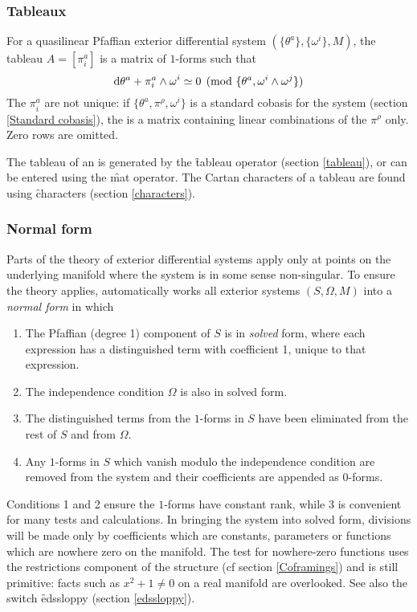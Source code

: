 \subsubsection{Tableaux}
\label{Tableaux}

For a quasilinear Pfaffian exterior differential system
$(\{\theta^a\},\{\omega^i\},M)$, the tableau $A=[\pi^a_i]$
is a matrix of $1$-forms such that
\[	\mathrm{d} \theta^a + \pi^a_i\wedge\omega^i \simeq 0
		\pmod{\{\theta^a,\omega^i\wedge\omega^j\}}
\]
The $\pi^a_i$ are not unique: if $\{\theta^a,\pi^\rho,\omega^i\}$ is a
standard cobasis for the system (section \ref{Standard cobasis}), the 
 is a matrix containing linear combinations of the $\pi^\rho$
only. Zero rows are omitted.

The tableau of an  is generated by the \f{tableau} operator
(section \ref{tableau}), or can be entered using the \f{mat} operator. The
Cartan characters of a tableau are found using \f{characters} (section
\ref{characters}).

\subsubsection{Normal form}
\label{Normal form}

Parts of the theory of exterior differential systems apply only at points
on the underlying manifold where the system is in some sense
non-singular. To ensure the theory applies,  automatically works all
exterior systems $(S,\Omega,M)$ into a \emph{normal form} in which

\begin{enumerate}
\item The Pfaffian (degree 1) component of $S$ is in \emph{solved} form,
      where each expression has a distinguished term with coefficient 1,
      unique to that expression.
\item The independence condition $\Omega$ is also in solved form.
\item The distinguished terms from the $1$-forms in $S$ have been eliminated
      from the rest of $S$ and from $\Omega$.
\item Any $1$-forms in $S$ which vanish modulo the independence condition are
      removed from the system and their coefficients are appended as
      0-forms.
\end{enumerate}

Conditions 1 and 2 ensure the $1$-forms have constant rank, while 3 is
convenient for many tests and calculations. In bringing the system into
solved form, divisions will be made only by coefficients which are
constants, parameters or functions which are nowhere zero on the
manifold. The test for nowhere-zero functions uses the restrictions
component of the  structure (cf section \ref{Coframings}) and
is still primitive: facts such as $x^2+1\neq0$ on a real manifold are
overlooked. See also the switch \f{edssloppy} (section \ref{edssloppy}).

